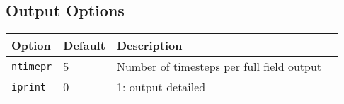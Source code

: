 \documentclass[letterpaper]{book}
\begin{document}
\subsection{Output Options}

\begin{tabular}{llll}
  \textbf{Option}&\textbf{Default}&\textbf{Description}\\
  \hline
  \texttt{ntimepr}   & 5 & Number of timesteps per full field output\\
  \texttt{iprint}    & 0              & 1: output detailed 
\end{tabular}





\appendix




\end{document}
